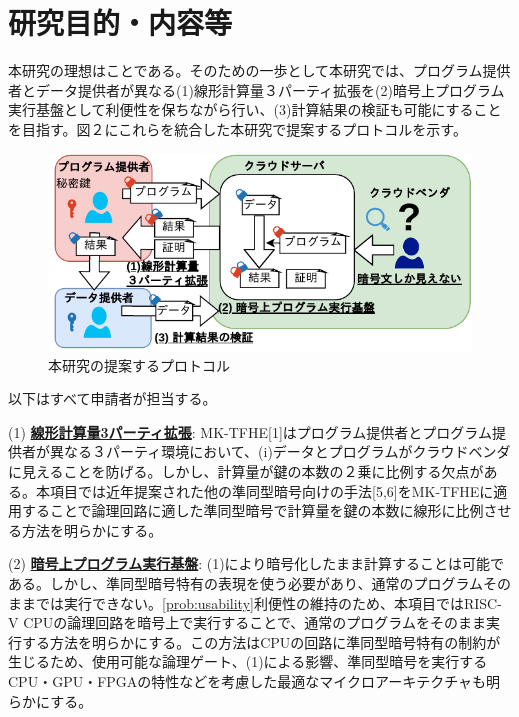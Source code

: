 
\section{研究目的・内容等}


本研究の理想はことである。そのための一歩として本研究では、プログラム提供者とデータ提供者が異なる(1)線形計算量３パーティ拡張を(2)暗号上プログラム実行基盤として利便性を保ちながら行い、(3)計算結果の検証も可能にすることを目指す。図２にこれらを統合した本研究で提案するプロトコルを示す。

\begin{figure}[h]
    \centering
    \includegraphics[width=0.8\linewidth]{figures/solution.drawio.pdf}
    \vspace*{-0.5cm}
    \caption{本研究の提案するプロトコル}
    \label{fig:solution}
\end{figure}


以下はすべて申請者が担当する。

\noindent(1) \underline{\textbf{線形計算量3パーティ拡張}}: MK-TFHE[1]はプログラム提供者とプログラム提供者が異なる３パーティ環境において、(i)データとプログラムがクラウドベンダに見えることを防げる。しかし、計算量が鍵の本数の２乗に比例する欠点がある。本項目では近年提案された他の準同型暗号向けの手法[5,6]をMK-TFHEに適用することで論理回路に適した準同型暗号で計算量を鍵の本数に線形に比例させる方法を明らかにする。

\noindent(2) \underline{\textbf{暗号上プログラム実行基盤}}: (1)により暗号化したまま計算することは可能である。しかし、準同型暗号特有の表現を使う必要があり、通常のプログラムそのままでは実行できない。\ref{prob:usability}利便性の維持のため、本項目ではRISC-V CPUの論理回路を暗号上で実行することで、通常のプログラムをそのまま実行する方法を明らかにする。この方法はCPUの回路に準同型暗号特有の制約が生じるため、使用可能な論理ゲート、(1)による影響、準同型暗号を実行するCPU・GPU・FPGAの特性などを考慮した最適なマイクロアーキテクチャも明らかにする。

